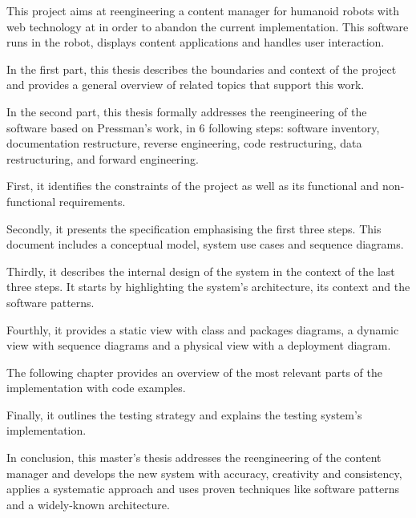 % 
% 
%

This project aims at reengineering a content manager for humanoid robots with web technology at \company in order to abandon the current \flash implementation.
This software runs in the robot, displays content applications and handles user interaction.

In the first part, this thesis describes the boundaries and context of the project and provides a general overview of related topics that support this work.

In the second part, this thesis formally addresses the reengineering of the software based on Pressman's work, in 6 following steps: software inventory, documentation restructure, reverse engineering, code restructuring, data restructuring, and forward engineering.

First, it identifies the constraints of the project as well as its functional and non-functional requirements.

Secondly, it presents the specification emphasising the first three steps.
This document includes a conceptual model, system use cases and sequence diagrams.

Thirdly, it describes the internal design of the system in the context of the last three steps.
It starts by highlighting the system's architecture, its context and the software patterns.

Fourthly, it provides a static view with class and packages diagrams, a dynamic view with sequence diagrams and a physical view with a deployment diagram.

The following chapter provides an overview of the most relevant parts of the implementation with code examples.

Finally, it outlines the testing strategy and explains the testing system's implementation.

In conclusion, this master's thesis addresses the reengineering of the content manager and develops the new system with accuracy, creativity and consistency, applies a systematic approach and uses proven techniques like software patterns and a widely-known architecture.

